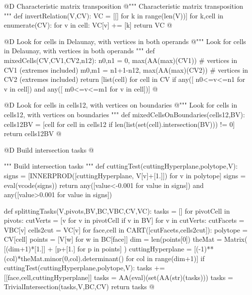 \documentclass[11pt,oneside]{article}	%
\begin{document}
@D Characteristic matrix transposition
@{""" Characteristic matrix transposition """
def invertRelation(V,CV):
	VC = [[] for k in range(len(V))]
	for k,cell in enumerate(CV):
		for v in cell:
			VC[v] += [k]
	return VC
@}


@D Look for cells in Delaunay, with vertices in both operands
@{""" Look for cells in Delaunay, with vertices in both operands """
def mixedCells(CV,CV1,CV2,n12):
	n0,n1 = 0, max(AA(max)(CV1))			# vertices in CV1 (extremes included)
	m0,m1 = n1+1-n12, max(AA(max)(CV2))		# vertices in CV2 (extremes included)
	return [list(cell) for cell in CV if any([ n0<=v<=n1 for v in cell]) 
		and any([ m0<=v<=m1 for v in cell])]
@}

@D Look for cells in cells12, with vertices on boundaries
@{""" Look for cells in cells12, with vertices on boundaries """
def mixedCellsOnBoundaries(cells12,BV):
	cells12BV = [cell for cell in cells12
					if len(list(set(cell).intersection(BV))) != 0]
	return cells12BV
@}

@D Build intersection tasks
@{""" Build intersection tasks """
def cuttingTest(cuttingHyperplane,polytope,V):
	signs = [INNERPROD([cuttingHyperplane, V[v]+[1.]]) for v in polytope]
	signs = eval(vcode(signs))
	return any([value<-0.001 for value in signs]) and any([value>0.001 for value in signs])

def splittingTasks(V,pivots,BV,BC,VBC,CV,VC):
	tasks = []
	for pivotCell in pivots:
		cutVerts = [v for v in pivotCell if v in BV]
		for v in cutVerts:
			cutFacets = VBC[v]
			cells2cut = VC[v]
			for face,cell in CART([cutFacets,cells2cut]):
				polytope = CV[cell]
				points = [V[w] for w in BC[face]]
				dim = len(points[0])
				theMat = Matrix( [(dim+1)*[1.]] + [p+[1.] for p in points] )
				cuttingHyperplane = [(-1)**(col)*theMat.minor(0,col).determinant() 
									for col in range(dim+1)]
				if cuttingTest(cuttingHyperplane,polytope,V):
					tasks += [[face,cell,cuttingHyperplane]]
	tasks = AA(eval)(set(AA(str)(tasks)))
	tasks = TrivialIntersection(tasks,V,BC,CV)
	return tasks
@}
\end{document}
